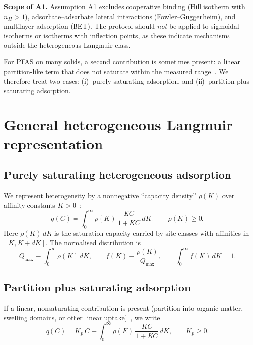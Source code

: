\documentclass[12pt]{article}
\begin{document}
\textbf{Scope of A1.}  Assumption A1 excludes cooperative binding
(Hill isotherm with $n_H>1$), adsorbate--adsorbate lateral interactions
(Fowler--Guggenheim), and multilayer adsorption (BET).  The protocol
should \emph{not} be applied to sigmoidal isotherms or isotherms with
inflection points, as these indicate mechanisms outside the heterogeneous
Langmuir class.

For PFAS on many solids, a second contribution is sometimes present: a
linear partition-like term that does not saturate within the measured
range~\cite{Vieth1976}.  We therefore treat two cases:
(i)~purely saturating adsorption, and
(ii)~partition plus saturating adsorption.

\section{General heterogeneous Langmuir representation}

\subsection{Purely saturating heterogeneous adsorption}

We represent heterogeneity by a nonnegative ``capacity density''
$\rho(K)$ over affinity constants $K>0$~\cite{Sips1948,Jaroniec1988}:
\begin{equation}
  q(C) = \int_{0}^{\infty} \rho(K)\,\frac{KC}{1+KC}\,dK,
  \qquad \rho(K)\ge 0.
  \label{eq:het_langmuir}
\end{equation}
Here $\rho(K)\,dK$ is the saturation capacity carried by site classes
with affinities in $[K,K+dK]$.  The normalised distribution is
\begin{equation}
  Q_{\max} \equiv \int_0^\infty \rho(K)\,dK,
  \qquad
  f(K) \equiv \frac{\rho(K)}{Q_{\max}},
  \qquad
  \int_0^\infty f(K)\,dK = 1.
  \label{eq:f_def}
\end{equation}

\subsection{Partition plus saturating adsorption}

If a linear, nonsaturating contribution is present (partition into
organic matter, swelling domains, or other linear
uptake)~\cite{Vieth1976,Paul1976}, we write
\begin{equation}
  q(C) = K_p\,C + \int_{0}^{\infty} \rho(K)\,\frac{KC}{1+KC}\,dK,
  \qquad K_p \ge 0.
  \label{eq:partition_plus_langmuir}
\end{equation}
\end{document}
